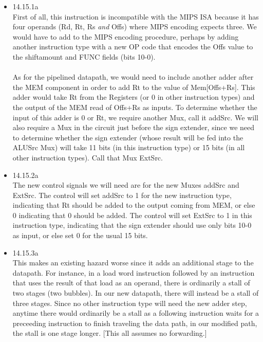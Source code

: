 \documentclass[a4paper]{article}
\begin{document}
\begin{itemize}
\item{14.15.1a} \\
First of all, this instruction is incompatible with the MIPS ISA because it has four operands (Rd, Rt, Rs \emph{and} Offs) where MIPS encoding expects three. We would have to add to the MIPS encoding procedure, perhaps by adding another instruction type with a new OP code that encodes the Offs value to the shiftamount and FUNC fields (bits 10-0). \\
\\
As for the pipelined datapath, we would need to include another adder after the MEM component in order to add Rt to the value of Mem[Offs+Rs]. This adder would take Rt from the Registers (or 0 in other instruction types) and the output of the MEM read of Offs+Rs as inputs. To determine whether the input of this adder is 0 or Rt, we require another Mux, call it addSrc. We will also require a Mux in the circuit just before the sign extender, since we need to determine whether the sign extender (whose result will be fed into the ALUSrc Mux) will take 11 bits (in this instruction type) or 15 bits (in all other instruction types). Call that Mux ExtSrc.
\\

\item{14.15.2a} \\
The new control signals we will need are for the new Muxes addSrc and ExtSrc. The control will set addSrc to 1 for the new instruction type, indicating that Rt should be added to the output coming from MEM, or else 0 indicating that 0 should be added. The control will set ExtSrc to 1 in this instruction type, indicating that the sign extender should use only bits 10-0 as input, or else set 0 for the usual 15 bits.
\\

\item{14.15.3a} \\
This makes an existing hazard worse since it adds an additional stage to the datapath. For instance, in a load word instruction followed by an instruction that uses the result of that load as an operand, there is ordinarily a stall of two stages (two bubbles). In our new datapath, there will instead be a stall of three stages. Since no other instruction type will need the new adder step, anytime there would ordinarily be a stall as a following instruction waits for a preceeding instruction to finish traveling the data path, in our modified path, the stall is one stage longer. [This all assumes no forwarding.]
\\


\end{itemize}
\end{document}
